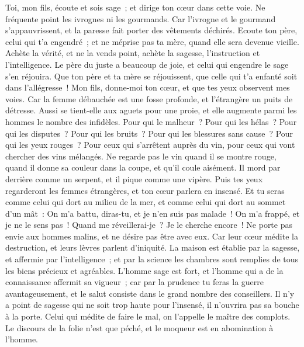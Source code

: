 \begin{multicols}{2}
Toi, mon fils, écoute et sois sage~; et dirige ton cœur dans cette voie.
Ne fréquente point les ivrognes ni les gourmands.
Car l'ivrogne et le gourmand s'appauvrissent, et la paresse fait porter des vêtements déchirés.
Ecoute ton père, celui qui t'a engendré~; et ne méprise pas ta mère, quand elle sera devenue vieille.
Achète la vérité, et ne la vends point, achète la sagesse, l'instruction et l'intelligence.
Le père du juste a beaucoup de joie, et celui qui engendre le sage s'en réjouira.
Que ton père et ta mère se réjouissent, que celle qui t'a enfanté soit dans l'allégresse~!
Mon fils, donne-moi ton cœur, et que tes yeux observent mes voies.
Car la femme débauchée est une fosse profonde, et l'étrangère un puits de détresse.
Aussi se tient-elle aux aguets pour une proie, et elle augmente parmi les hommes le nombre des infidèles.
Pour qui le malheur~? Pour qui les hélas~? Pour qui les disputes~? Pour qui les bruits~? Pour qui les blessures sans cause~? Pour qui les yeux rouges~?
Pour ceux qui s'arrêtent auprès du vin, pour ceux qui vont chercher des vins mélangés.
Ne regarde pas le vin quand il se montre rouge, quand il donne sa couleur dans la coupe, et qu'il coule aisément.
Il mord par derrière comme un serpent, et il pique comme une vipère.
Puis tes yeux regarderont les femmes étrangères, et ton cœur parlera en insensé.
Et tu seras comme celui qui dort au milieu de la mer, et comme celui qui dort au sommet d'un mât~:
On m'a battu, diras-tu, et je n'en suis pas malade~! On m'a frappé, et je ne le sens pas~! Quand me réveillerai-je~? Je le cherche encore~!
\VerseOne{}Ne porte pas envie aux hommes malins, et ne désire pas être avec eux.
Car leur cœur médite la destruction, et leurs lèvres parlent d'iniquité.
La maison est établie par la sagesse, et affermie par l'intelligence~;
et par la science les chambres sont remplies de tous les biens précieux et agréables.
L'homme sage est fort, et l'homme qui a de la connaissance affermit sa vigueur~;
car par la prudence tu feras la guerre avantageusement, et le salut consiste dans le grand nombre des conseillers.
Il n'y a point de sagesse qui ne soit trop haute pour l'insensé, il n'ouvrira pas sa bouche à la porte.
Celui qui médite de faire le mal, on l'appelle le maître des complots.
Le discours de la folie n'est que péché, et le moqueur est en abomination à l'homme.

\end{multicols}
